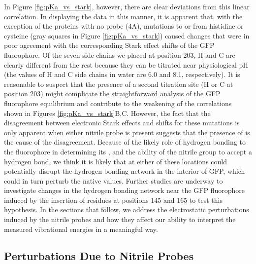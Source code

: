In Figure \ref{fig:pKa_vs_stark}, however, there are clear deviations from this linear correlation.
In displaying the data in this manner, it is apparent that, with the exception of the proteins with no \pCNF{} probe (4A), mutations to or from histidine or cysteine (gray squares in Figure \ref{fig:pKa_vs_stark}) caused \pKa{} changes that were in poor agreement with the corresponding Stark effect shifts of the GFP fluorophore.
Of the seven side chains we placed at position 203, H and C are clearly different from the rest because they can be titrated near physiological pH (the \pKa{} values of H and C side chains in water are 6.0 and 8.1, respectively).
It is reasonable to suspect that the presence of a second titration site (H or C at position 203) might complicate the straightforward analysis of the GFP fluorophore equilibrium and contribute to the weakening of the correlations shown in Figures \ref{fig:pKa_vs_stark}B,C.
However, the fact that the disagreement between electronic Stark effects and \pKa{} shifts for these mutations is only apparent when either nitrile probe is present suggests that the presence of \pCNF{} is the cause of the disagreement.
Because of the likely role of hydrogen bonding to the fluorophore in determining its \pKa{}, and the ability of the nitrile group to accept a hydrogen bond, we think it is likely that \pCNF{} at either of these locations could potentially disrupt the hydrogen bonding network in the interior of GFP, which could in turn perturb the native \pKa{} values.
Further studies are underway to investigate changes in the hydrogen bonding network near the GFP fluorophore induced by the insertion of \pCNF{} residues at positions 145 and 165 to test this hypothesis.
In the sections that follow, we address the electrostatic perturbations induced by the nitrile probes and how they affect our ability to interpret the measured vibrational energies in a meaningful way.

\subsection{\pKa{} Perturbations Due to Nitrile Probes}

